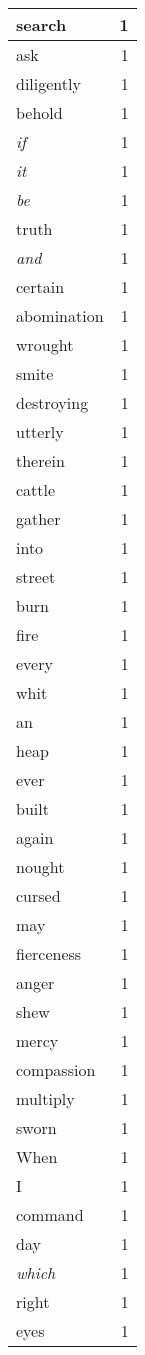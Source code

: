 \begin{center}
\begin{longtable}{l|r}
search & 1 \\ \hline
ask & 1 \\ \hline
diligently & 1 \\ \hline
behold & 1 \\ \hline
\emph{if} & 1 \\ \hline
\emph{it} & 1 \\ \hline
\emph{be} & 1 \\ \hline
truth & 1 \\ \hline
\emph{and} & 1 \\ \hline
certain & 1 \\ \hline
abomination & 1 \\ \hline
wrought & 1 \\ \hline
smite & 1 \\ \hline
destroying & 1 \\ \hline
utterly & 1 \\ \hline
therein & 1 \\ \hline
cattle & 1 \\ \hline
gather & 1 \\ \hline
into & 1 \\ \hline
street & 1 \\ \hline
burn & 1 \\ \hline
fire & 1 \\ \hline
every & 1 \\ \hline
whit & 1 \\ \hline
an & 1 \\ \hline
heap & 1 \\ \hline
ever & 1 \\ \hline
built & 1 \\ \hline
again & 1 \\ \hline
nought & 1 \\ \hline
cursed & 1 \\ \hline
may & 1 \\ \hline
fierceness & 1 \\ \hline
anger & 1 \\ \hline
shew & 1 \\ \hline
mercy & 1 \\ \hline
compassion & 1 \\ \hline
multiply & 1 \\ \hline
sworn & 1 \\ \hline
When & 1 \\ \hline
I & 1 \\ \hline
command & 1 \\ \hline
day & 1 \\ \hline
\emph{which} & 1 \\ \hline
right & 1 \\ \hline
eyes & 1 \\ \hline
\end{longtable}
\end{center}



